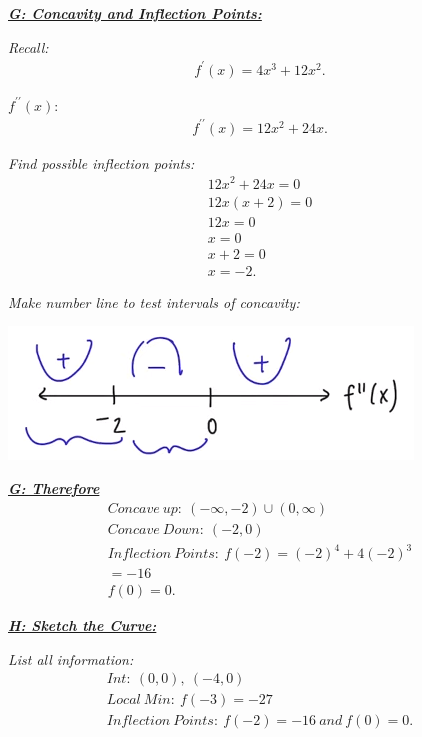 \documentclass{report}
\begin{document}
  \bigbreak \noindent 
  \textbf{\textit{\underline{G: Concavity and Inflection Points:}}}

  \bigbreak \noindent 
  \textit{Recall:}
  \begin{align*}
    f^{\prime}(x) = 4x^{3}+12x^{2}
  .\end{align*} 

  \bigbreak \noindent 
  \textit{$f^{\prime\prime}(x)$}:
  \begin{align*}
    f^{\prime\prime}(x) = 12x^{2} + 24x
  .\end{align*}

  \bigbreak \noindent 
  \textit{Find possible inflection points:}
  \begin{align*}
    12x^{2} +24x = 0 \\
    12x(x+2) = 0 \\
    12x = 0 \\
    \boxed{x= 0} \\
    x+2 = 0 \\
    \boxed{x= -2}
  .\end{align*}

  \bigbreak \noindent 
  \textit{Make number line to test intervals of concavity:}

  \bigbreak \noindent 
  \begin{center}
    \includegraphics[scale=0.7]{ ./images/15.png }
  \end{center}

  \bigbreak \noindent 
  \textbf{\textit{\underline{G: Therefore}}}
  \begin{align*}
    Concave\ up:\ (-\infty, -2) \cup (0,\infty) \\
    Concave\ Down:\ (-2,0) \\
    Inflection\ Points:\ f(-2) = (-2)^{4} + 4(-2)^{3} \\
    \boxed{= -16} \\
    \boxed{f(0) = 0}
  .\end{align*}

  \pagebreak \bigbreak \noindent
  \textbf{\textit{\underline{H: Sketch the Curve:}}}

  \bigbreak \noindent 
  \textit{List all information:}
  \begin{align*}
    Int:\ (0,0),\ (-4,0) \\
    Local\ Min:\ f(-3) = -27 \\
    Inflection\ Points:\ f(-2) = -16\ and\ f(0) = 0
  .\end{align*}
\end{document}
